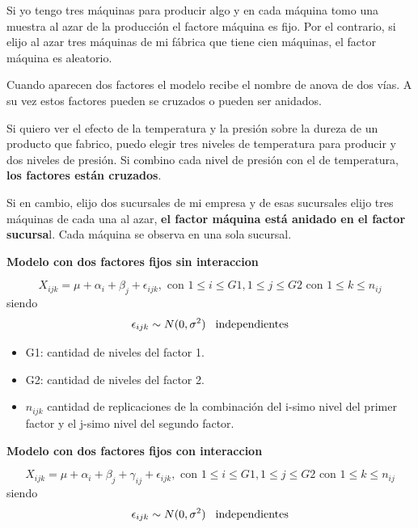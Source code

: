 \documentclass[a4paper,12pt]{article}
\begin{document}
Si yo tengo tres máquinas para producir algo y en cada máquina tomo una muestra al azar de la producción el factore máquina es fijo.
Por el contrario, si elijo al azar tres máquinas de mi fábrica que tiene cien máquinas, el factor máquina es aleatorio.

Cuando aparecen dos factores el modelo recibe el nombre de anova de dos vías.
A su vez estos factores pueden se cruzados o pueden ser anidados.

\begin{center}
\end{center}

Si quiero ver el efecto de la temperatura y la presión sobre la dureza de un producto que fabrico, puedo elegir tres niveles de temperatura para producir y dos niveles de presión.
Si combino cada nivel de presión con el de temperatura, \textbf{los factores están cruzados}.

Si en cambio, elijo dos sucursales de mi empresa y de esas sucursales elijo tres máquinas de cada una al azar, \textbf{el factor máquina está anidado en el factor sucursa}l. Cada máquina se observa en una sola sucursal.


\textbf{\textcolor{BlueGreen}{Modelo con dos factores fijos sin interaccion}}

\[X_{ijk}=\mu+\alpha_i+\beta_j+\epsilon_{ijk} ,\,\, \text{con} \,\, 1 \leq i \leq G1, 1 \leq j \leq G2 \,\, \text{con} \,\, 1 \leq k \leq n_{ij}
\]
siendo
\[
\epsilon_{ijk}\sim N(0,\sigma^2) \hspace{0.3cm} \text{independientes}
\]
\begin{itemize}
	\item G1: cantidad de niveles del factor 1.
	\item G2: cantidad de niveles del factor 2.
	\item $n_{ijk}$ cantidad de replicaciones de la combinación del i-simo nivel  del primer factor y el j-simo nivel  del segundo factor.
\end{itemize}


\textbf{\textcolor{BlueGreen}{Modelo con dos factores fijos con interaccion}}


\[X_{ijk}=\mu+\alpha_i+\beta_j+\gamma_{ij}+\epsilon_{ijk} ,\,\, \text{con} \,\, 1 \leq i \leq G1, 1 \leq j \leq G2 \,\, \text{con} \,\, 1 \leq k \leq n_{ij}
\]
siendo
\[
\epsilon_{ijk}\sim N(0,\sigma^2) \hspace{0.3cm} \text{independientes}
\]
\end{document}
